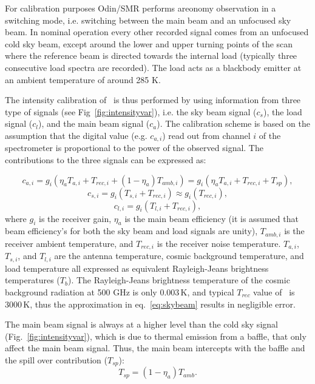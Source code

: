 For calibration purposes Odin/SMR performs areonomy observation in a switching
mode, i.e. switching between the main beam and an unfocused sky beam. 
In nominal operation every other recorded signal comes from an unfocused cold sky
beam, except around the lower and upper turning points of the scan where the reference
beam is directed towards the internal load (typically three consecutive load spectra are
recorded). The load acts as a blackbody emitter at an ambient temperature of around 285
K. 

The intensity calibration of \smr\ is thus performed by using
information from three type of signals (see Fig~\ref{fig:intensityvar}), 
i.e. the sky beam signal (\(c_{s}\)), the load signal (\(c_{l}\)), 
and the main beam signal (\(c_{a}\)).
The calibration scheme is based on the assumption that the
digital value (e.g. \(c_{a,i}\)) read out from channel \(i\) of the
spectrometer is proportional to the power of the
observed signal. The contributions to the three signals
can be expressed as:

\begin{equation}
c_{a,i}=g_{i}\left(\eta_{a} T_{a,i} + T_{rec,i} + (1-\eta_{a})T_{amb,i} \right) = 
g_{i}\left(\eta_{a} T_{a,i} + T_{rec,i} + T_{sp} \right) ,
\end{equation}
\begin{equation}
\label{eq:skybeam}
c_{s,i}=g_{i}\left(T_{s,i}+T_{rec,i}\right) \approx g_{i}\left(T_{rec,i}\right),
\end{equation}
\begin{equation}
c_{l,i}=g_{i}\left(T_{l,i}+T_{rec,i}\right),
\end{equation}
where \(g_{i}\) is the receiver gain, \(\eta_{a}\) is the main beam
efficiency (it is assumed that beam efficiency's for
both the sky beam and load signals are unity),
\(T_{amb,i}\) is the receiver ambient temperature,
and \(T_{rec,i}\) is the receiver noise temperature.
\(T_{a,i}\), \(T_{s,i}\), and \(T_{l,i}\) are the antenna temperature,
cosmic background temperature, and load temperature all expressed
as equivalent Rayleigh-Jeans brightness temperatures (\(T_{b}\)).
The Rayleigh-Jeans brightness temperature of the cosmic background radiation
at 500 GHz is only 0.003\,K, and typical \(T_{rec}\) value of \smr\ is 3000\,K,
thus the approximation in eq.~\ref{eq:skybeam} results in negligible error.

The main beam signal is always at a higher level than the cold sky signal
(Fig.~\ref{fig:intensityvar}), which is due 
to thermal emission from a baffle, that only affect the main beam signal.
Thus, the main beam intercepts with the baffle
and the spill over contribution (\(T_{sp}\)):
\begin{equation}
\label{eq:tspill1}
T_{sp}=(1-\eta_{a})T_{amb}.
\end{equation}

